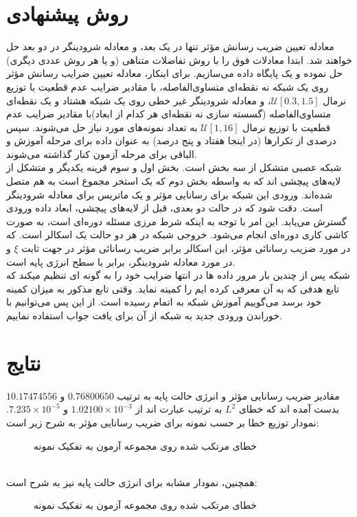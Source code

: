 \section*{روش پیشنهادی }
معادله تعیین ضریب رسانش مؤثر تنها در یک بعد، و معادله شرودینگر در دو بعد حل خواهند شد. ابتدا معادلات فوق را با روش‌ تفاضلات متناهی (و یا هر روش عددی دیگری) حل نموده و یک پایگاه داده می‌سازیم. برای اینکار، معادله تعیین ضرایب رسانش مؤثر روی یک شبکه نه نقطه‌ای متساوی‌الفاصله، با مقادیر ضرایب عدم قطعیت با توزیع نرمال $\mathscr{U}[0.3, 1.5]$، و معادله شرودینگر غیر خطی روی یک شبکه هشتاد و یک نقطه‌ای متساوی‌الفاصله (گسسته سازی نه نقطه‌ای هر کدام از ابعاد)با مقادیر ضرایب عدم قطعیت با توزیع نرمال $\mathscr{U}[1, 16]$ به تعداد نمونه‌های مورد نیاز حل می‌شوند. سپس درصدی از تکرارها (در اینجا هفتاد و پنج درصد) به عنوان داده برای مرحله آموزش و الباقی برای مرحله آزمون کنار گذاشته می‌شوند.\\
شبکه عصبی متشکل از سه بخش است. بخش اول و سوم قرینه یکدیگر و متشکل از لایه‌های پیچشی   اند که به واسطه بخش دوم که یک استخر مجموع  است به هم متصل شده‌اند. ورودی این شبکه برای رسانایی مؤثر و یک ماتریس برای معادله شرودینگر است. دقت شود که در حالت دو بعدی، قبل از لایه‌های پیچشی، ابعاد داده ورودی گسترش می‌یابد. این امر با توجه به اینکه شرط مرزی مسئله دوره‌ای است، به صورت کاشی کاری دوره‌ای انجام می‌شود. خروجی شبکه در هر دو حالت یک اسکالر است. که در مورد ضزیب رسانائی مؤثر، این اسکالر برابر ضریب رسانائی مؤثر در جهت ثابت $\xi$ و در مورد معادله شرودینگر، برابر با سطح انرژی پایه است.\\
شبکه پس از چندین بار مرور داده ها در انتها ضرایب خود را به گونه ای تنظیم میکند که تابع هدفی که به آن معرفی کرده ایم را کمینه نماید. وقتی تابع مذکور به میزان کمینه خود برسد می‌گوییم آموزش شبکه به اتمام رسیده است. از این پس می‌توانیم با خوراندن ورودی جدید به شبکه از آن برای یافت جواب استفاده نماییم.\\
\clearpage
\newpage
\section*{نتایج}
مقادیر ضریب رسانایی مؤثر و انرژی حالت پایه به ترتیب $0.76800650$ و $10.17474556$ بدست آمده اند که خطای $L^2$ به ترتیب عبارت اند از $1.02100 \times 10^{-3}$ و $7.235 \times 10^{-5}$. نمودار توزیع خطا بر حسب نمونه برای ضریب رسانایی مؤثر به شرح زیر است:
\begin{figure}[h!]
	{
		\centering
		\def\svgwidth{\columnwidth}
		\scalebox{.5}{}
		\caption{خطای مرتکب شده  روی مجموعه آزمون به تفکیک نمونه}
		\label{fig:ECIM_error_bar}
	}
\end{figure}
\\همچنین، نمودار مشابه برای انرژی حالت پایه نیز به شرح است:
\begin{figure}[h!]
	{
		\centering
		\def\svgwidth{\columnwidth}
		\scalebox{.5}{}
		\caption{خطای مرتکب شده  روی مجموعه آزمون به تفکیک نمونه}
		\label{fig:NLSE_error_bar}
	}
\end{figure}
\clearpage
\newpage
